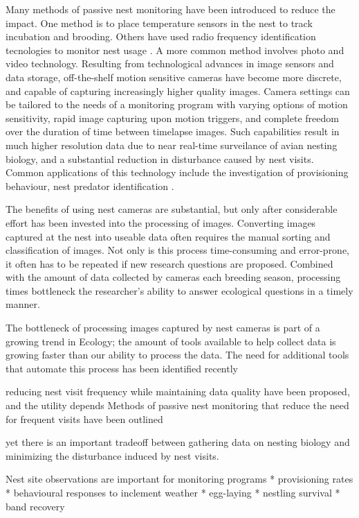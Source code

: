 Many methods of passive nest monitoring have been introduced to reduce the impact.
One method is to place temperature sensors in the nest to track incubation and brooding.
Others have used radio frequency identification tecnologies to monitor nest usage \cite{alba2019ZB}.
A more common method involves photo and video technology.
Resulting from technological advances in image sensors and data storage, off-the-shelf motion sensitive cameras have become more discrete, and capable of capturing increasingly higher quality images.
Camera settings can be tailored to the needs of a monitoring program with varying options of motion sensitivity, rapid image capturing upon motion triggers, and complete freedom over the duration of time between timelapse images. 
Such capabilities result in much higher resolution data due to near real-time surveilance of avian nesting biology, and a substantial reduction in disturbance caused by nest visits.
Common applications of this technology include the investigation of provisioning behaviour, nest predator identification \cite{cox2012LE,degregorio2014EE}.

 
 
 
 
The benefits of using nest cameras are substantial, but only after considerable effort has been invested into the processing of images.
Converting images captured at the nest into useable data often requires the manual sorting and classification of images.
Not only is this process time-consuming and error-prone, it often has to be repeated if new research questions are proposed.
Combined with the amount of data collected by cameras each breeding season, processing times bottleneck the researcher's ability to answer ecological questions in a timely manner.

 
 
 
 
The bottleneck of processing images captured by nest cameras is part of a growing trend in Ecology; the amount of tools available to help collect data is growing faster than our ability to process the data. 
The need for additional tools that automate this process has been identified recently

reducing nest visit frequency while maintaining data quality have been proposed, and the utility depends Methods of passive nest monitoring that reduce the need for frequent visits have been outlined


yet there is an important tradeoff between gathering data on nesting biology and minimizing the disturbance induced by nest visits.

Nest site observations are important for monitoring programs
* provisioning rates
* behavioural responses to inclement weather
* egg-laying
* nestling survival
* band recovery


 

 
 






